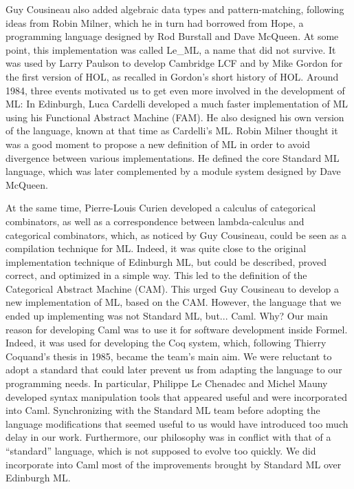 \documentclass[14pt]{matmex-diploma-custom}
\begin{document}
Guy Cousineau also added algebraic data types and pattern-matching, following ideas from Robin Milner, which he in turn had borrowed from Hope, a programming language designed by Rod Burstall and Dave McQueen. At some point, this implementation was called Le\_ML, a name that did not survive. It was used by Larry Paulson to develop Cambridge LCF and by Mike Gordon for the first version of HOL, as recalled in Gordon's short history of HOL.
Around 1984, three events motivated us to get even more involved in the development of ML:
In Edinburgh, Luca Cardelli developed a much faster implementation of ML using his Functional Abstract Machine (FAM). He also designed his own version of the language, known at that time as Cardelli's ML.
Robin Milner thought it was a good moment to propose a new definition of ML in order to avoid divergence between various implementations. He defined the core Standard ML language, which was later complemented by a module system designed by Dave McQueen.

At the same time, Pierre-Louis Curien developed a calculus of categorical combinators, as well as a correspondence between lambda-calculus and categorical combinators, which, as noticed by Guy Cousineau, could be seen as a compilation technique for ML. Indeed, it was quite close to the original implementation technique of Edinburgh ML, but could be described, proved correct, and optimized in a simple way. This led to the definition of the Categorical Abstract Machine (CAM).
This urged Guy Cousineau to develop a new implementation of ML, based on the CAM. However, the language that we ended up implementing was not Standard ML, but... Caml. Why? Our main reason for developing Caml was to use it for software development inside Formel. Indeed, it was used for developing the Coq system, which, following Thierry Coquand's thesis in 1985, became the team's main aim. We were reluctant to adopt a standard that could later prevent us from adapting the language to our programming needs. In particular, Philippe Le Chenadec and Michel Mauny developed syntax manipulation tools that appeared useful and were incorporated into Caml. Synchronizing with the Standard ML team before adopting the language modifications that seemed useful to us would have introduced too much delay in our work. Furthermore, our philosophy was in conflict with that of a “standard” language, which is not supposed to evolve too quickly. We did incorporate into Caml most of the improvements brought by Standard ML over Edinburgh ML.
\end{document}
